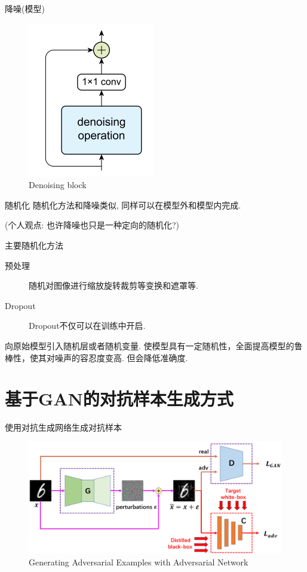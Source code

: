 \documentclass[UTF8, aspectratio=169, 10pt, t]{ctexbeamer}
\begin{document}
\begin{frame}{降噪(模型)}
	\begin{figure}
		\centering
		\includegraphics[height=0.5\textheight]{DNB}
		\caption{Denoising block}
		\label{fig:dnb}
	\end{figure}
	
\end{frame}

\begin{frame}{随机化}
	随机化方法和降噪类似, 同样可以在模型外和模型内完成. 
	
	(个人观点: 也许降噪也只是一种定向的随机化?)
	\begin{block}{主要随机化方法}
		\begin{description}
			\item[预处理] 随机对图像进行缩放旋转裁剪等变换和遮罩等.
			\item[Dropout] Dropout不仅可以在训练中开启.
		\end{description}
	\end{block}
	向原始模型引入随机层或者随机变量. 使模型具有一定随机性，全面提高模型的鲁棒性，使其对噪声的容忍度变高. 但会\alert{降低准确度}.
\end{frame}

\section{基于GAN的对抗样本生成方式}

\begin{frame}{使用对抗生成网络生成对抗样本}
	\begin{figure}
		\centering
		\includegraphics[width=0.9\linewidth]{ggans/advgan}
		\caption{Generating Adversarial Examples with Adversarial Network}
		\label{fig:advgan}
	\end{figure}
	
\end{frame}
\end{document}
